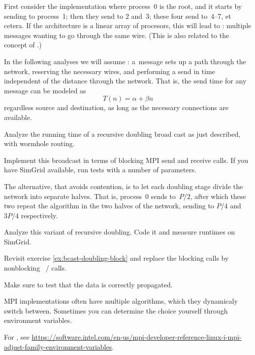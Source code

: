 First consider the implementation where process~0 is the root, and it
starts by sending to process~1; then they send to 2 and~3; these four
send to~4--7, et cetera. If the architecture is a linear array of
procesors, this will lead to : multiple messages
wanting to go through the same wire. (This is also related to the
concept of .)

In the following analyses we will assume :
a~message sets up a path through the network, reserving the necessary
wires, and performing a send in time independent of the distance
through the network. That is, the send time for any message can be
modeled as \[ T(n)=\alpha+\beta n \] regardless source and
destination, as long as the necessary connections are available. 

\begin{exercise}
  \label{ex:bcast-doubling-block}
  Analyze the running time of a recursive doubling broad cast as just
  described, with wormhole routing.

  Implement this broadcast in terms of blocking MPI send and receive calls.
  If you have SimGrid available, run
  tests with a number of parameters.
\end{exercise}

The alternative, that avoids contention, is to let each doubling stage
divide the network into separate halves. That is, process~0 sends
to~$P/2$, after which these two repeat the algorithm in the two halves
of the network, sending to $P/4$ and $3P/4$ respectively.

\begin{exercise}
  Analyze this variant of recursive doubling. Code it and measure
  runtimes on SimGrid.
\end{exercise}

\begin{exercise}
  \label{ex:bcast-doubling-nonblock}
  Revisit exercise \ref{ex:bcast-doubling-block} and replace the
  blocking calls by nonblocking ~/  calls.

  Make sure to test that the data is correctly propagated.
\end{exercise}

MPI implementations often have multiple algorithms, which they
dynamicaly switch between. Sometimes you can determine the choice yourself
through environment variables.

\begin{taccnote}
  For , see
  \url{https://software.intel.com/en-us/mpi-developer-reference-linux-i-mpi-adjust-family-environment-variables}.
\end{taccnote}

